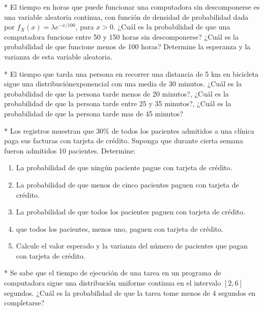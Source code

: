 \begin{Quest}*
El tiempo en horas que puede funcionar una computadora sin descomponerse es una variable aleatoria continua, con función de densidad de probabilidad dada por $f_{X}\left(x\right)=\lambda e^{-x/100}$, para $x>0$. ¿Cuál es la probabilidad de que una computadora funcione entre 50 y 150 horas sin descomponerse? ¿Cuál es la probabilidad de que funcione menos de 100 horas? Determine la esperanza y la varianza de esta variable aleatoria.
\end{Quest}

\begin{Quest}*
El tiempo que tarda una persona en recorrer una distancia de 5 km en bicicleta sigue una distribuci\'onexponencial con una media de 30 minutos. ¿Cu\'al es la probabilidad de que la persona tarde menos de 20 minutos?, ¿Cu\'al es la probabilidad de que la persona tarde entre 25 y 35 minutos?, ¿Cu\'al es la probabilidad de que la persona tarde mas de 45 minutos?
\end{Quest}

\begin{Quest}*
Los registros muestran que $30\%$ de todos los pacientes admitidos a una clínica paga sus facturas con tarjeta de crédito. Suponga que durante cierta semana fueron admitidos 10 pacientes. Determine:
\begin{enumerate}
\item La probabilidad de que ningún paciente pague con tarjeta de crédito.
\item La probabilidad de que menos de cinco pacientes paguen con tarjeta de crédito.
\item La probabilidad de que todos los pacientes paguen con tarjeta de crédito.
\item que todos los pacientes, menos uno, paguen con tarjeta de crédito.
\item Calcule el valor esperado y la varianza del número de pacientes que pagan con tarjeta de crédito.
\end{enumerate}
\end{Quest}

\begin{Quest}*
Se sabe que el tiempo de ejecución de una tarea en un programa de computadora sigue una distribución uniforme continua en el intervalo $[2, 6]$ segundos. ¿Cuál es la probabilidad de que la tarea tome menos de 4 segundos en completarse?
\end{Quest}


